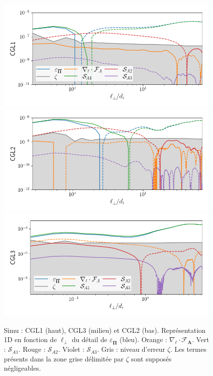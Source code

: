 \begin{figure}[!ht]
 \centering
 \includegraphics[width=0.9\linewidth,trim=0cm 0cm 0cm 0.5cm, clip=true]{./Part_3/images_ch3/CGL1_compa_cgl}
\includegraphics[width=0.9\linewidth,trim=0cm 0cm 0cm 0.5cm, clip=true]{./Part_3/images_ch3/CGL2_compa_cgl}
 \includegraphics[width=0.9\linewidth,trim=0cm 0cm 0cm 0.5cm, clip=true]{./Part_3/images_ch3/CGL3_compa_cgl}
\cprotect\caption{Simu : CGL1 (haut), CGL3 (milieu) et  CGL2 (bas). Représentation \acs{1D} en fonction de $\ell_{\perp}$ du détail de $\varepsilon_{\overline{\boldsymbol{\Pi}}}$ (bleu). Orange : $\nabla_{\boldsymbol{\ell}} \cdot \boldsymbol{\mathcal{F}_A}$. Vert : $\mathcal{S}_{A1}$. Rouge : $\mathcal{S}_{A2}$. Violet : $\mathcal{S}_{A3}$. Gris : niveau d'erreur $\zeta$. Les termes présents dans la zone grise délimitée par $\zeta$ sont supposés négligeables. }
\label{fig:detail_simu_CGL1-2}
\end{figure}

